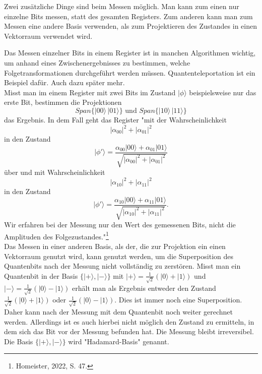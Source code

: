 Zwei zusätzliche Dinge sind beim Messen möglich. Man kann zum einen nur einzelne Bits messen, statt des gesamten Registers. Zum anderen kann man zum Messen eine andere Basis verwenden, als zum Projektieren des Zustandes in einen Vektorraum verwendet wird. 

Das Messen einzelner Bits in einem Register ist in manchen Algorithmen wichtig, um anhand eines Zwischenergebnisses zu bestimmen, welche Folgetransformationen durchgeführt werden müssen. Quantenteleportation ist ein Beispiel dafür. Auch dazu später mehr.\\

Misst man im einem Register mit zwei Bits im Zustand $\left|\phi\right.\rangle$ beispielsweise nur das erste Bit, bestimmen die Projektionen 
$$Span\{\left|00\right.\rangle\,\left|01\right.\rangle\} \text{ und }Span\{\left|10\right.\rangle\,\left|11\right.\rangle\}$$ das Ergebnis.
In dem Fall geht das Register "mit der Wahrscheinlichkeit
$$\left|\alpha_{00}\right|^2+\left|\alpha_{01}\right|^2$$
in den Zustand 
$$\left|\phi'\right.\rangle=\frac{\alpha_{00}\left|00\right.\rangle+\alpha_{01}\left|01\right.\rangle}{\sqrt{\left|\alpha_{00}\right|^2+\left|\alpha_{01}\right|^2}}$$
über und mit Wahrscheinlichkeit
$$\left|\alpha_{10}\right|^2+\left|\alpha_{11}\right|^2$$
in den Zustand 
$$\left|\phi'\right.\rangle=\frac{\alpha_{10}\left|00\right.\rangle+\alpha_{11}\left|01\right.\rangle}{\sqrt{\left|\alpha_{10}\right|^2+\left|\alpha_{11}\right|^2}}.$$
Wir erfahren bei der Messung nur den Wert des gemessenen Bits, nicht
die Amplituden des Folgezustandes."\footnote{Homeister, 2022, S. 47.}\\

Das Messen in einer anderen Basis, als der, die zur Projektion ein einen Vektorraum genutzt wird, kann genutzt werden, um die Superposition des Quantenbits nach der Messung nicht vollständig zu zerstören. 
Misst man ein Quantenbit in der Basis $\{\left|+\right.\rangle,\left|-\right.\rangle\}$ mit $\left|+\right.\rangle=\frac{1}{\sqrt{2}}\left(\left|0\right.\rangle+\left|1\right.\rangle\right)$ und $\left|-\right.\rangle=\frac{1}{\sqrt{2}}\left(\left|0\right.\rangle-\left|1\right.\rangle\right)$ erhält man als Ergebnis entweder den Zustand $\frac{1}{\sqrt{2}}\left(\left|0\right.\rangle+\left|1\right.\rangle\right)$ oder $\frac{1}{\sqrt{2}}\left(\left|0\right.\rangle-\left|1\right.\rangle\right)$. Dies ist immer noch eine Superposition. Daher kann nach der Messung mit dem Quantenbit noch weiter gerechnet werden. Allerdings ist es auch hierbei nicht möglich den Zustand zu ermitteln, in dem sich das Bit vor der Messung befunden hat. Die Messung bleibt irreversibel. Die Basis $\{\left|+\right.\rangle,\left|-\right.\rangle\}$ wird "Hadamard-Basis" genannt.\\\newpage

